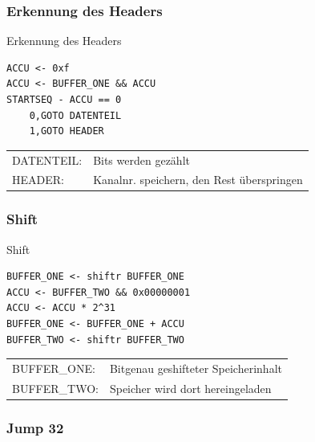 \documentclass{beamer}
\begin{document}
\subsubsection{Erkennung des Headers}



\begin{frame}[fragile]{Erkennung des Headers}

{\footnotesize\begin{verbatim}
ACCU <- 0xf
ACCU <- BUFFER_ONE && ACCU
STARTSEQ - ACCU == 0
    0,GOTO DATENTEIL
    1,GOTO HEADER
\end{verbatim}}
\begin{tabular}{ll}
DATENTEIL: & Bits werden gezählt\\
HEADER: & Kanalnr. speichern, den Rest überspringen
\end{tabular}

\end{frame}



\subsubsection{Shift}



\begin{frame}[fragile]{Shift}

{\footnotesize\begin{verbatim}
BUFFER_ONE <- shiftr BUFFER_ONE
ACCU <- BUFFER_TWO && 0x00000001
ACCU <- ACCU * 2^31
BUFFER_ONE <- BUFFER_ONE + ACCU
BUFFER_TWO <- shiftr BUFFER_TWO
\end{verbatim}}
\begin{tabular}{ll}
BUFFER\_ONE:& Bitgenau geshifteter Speicherinhalt\\
BUFFER\_TWO:& Speicher wird dort hereingeladen
\end{tabular}
\end{frame}



\subsubsection{Jump 32}
\end{document}
